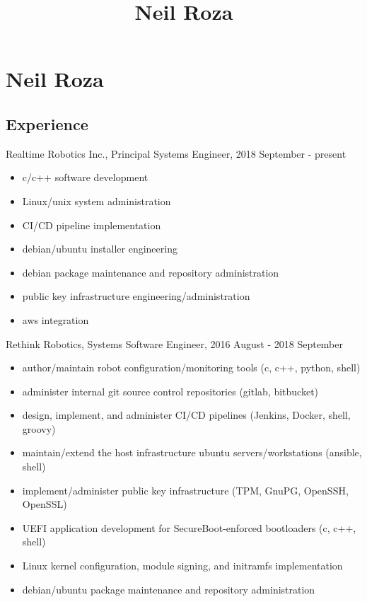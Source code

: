 \documentclass[letterpaper,11pt]{article}
\title{Neil Roza}
\begin{document}
\pagestyle{empty}

\section*{Neil Roza}



\subsection*{Experience}

Realtime Robotics Inc., Principal Systems Engineer, 2018 September - present

\begin{itemize}
\item c/c++ software development
\item Linux/unix system administration
\item CI/CD pipeline implementation
\item debian/ubuntu installer engineering
\item debian package maintenance and repository administration
\item public key infrastructure engineering/administration
\item aws integration
\end{itemize}

Rethink Robotics, Systems Software Engineer, 2016 August - 2018 September

\begin{itemize}
\item author/maintain robot configuration/monitoring tools (c, c++, python,
  shell)
\item administer internal git source control repositories (gitlab, bitbucket)
\item design, implement, and administer CI/CD pipelines (Jenkins, Docker,
  shell, groovy)
\item maintain/extend the host infrastructure ubuntu servers/workstations (ansible,
  shell)
\item implement/administer public key infrastructure (TPM, GnuPG, OpenSSH,
  OpenSSL)
\item UEFI application development for SecureBoot-enforced bootloaders (c, c++,
  shell)
\item Linux kernel configuration, module signing, and initramfs implementation
\item debian/ubuntu package maintenance and repository administration
\end{itemize}
\end{document}
